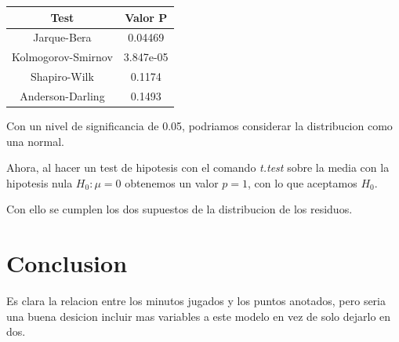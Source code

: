 \documentclass[onecolumn]{IEEEtran}
\begin{document}
    \begin{table}[h]
        \begin{center}
            \begin{tabular}{|c|c|}
                \hline Test & Valor P \\ \hline
                Jarque-Bera & 0.04469 \\ \hline
                Kolmogorov-Smirnov & 3.847e-05\\ \hline
                Shapiro-Wilk & 0.1174 \\ \hline
                Anderson-Darling & 0.1493 \\ \hline
            \end{tabular}
        \end{center}
    \end{table}

    Con un nivel de significancia de 0.05, podriamos considerar la distribucion como una normal.

    Ahora, al hacer un test de hipotesis con el comando \textit{t.test} sobre la media con la hipotesis nula $H_0: \mu = 0$ obtenemos un valor $p = 1$, con lo que aceptamos $H_0$.

    Con ello se cumplen los dos supuestos de la distribucion de los residuos.

    \section{Conclusion}
    Es clara la relacion entre los minutos jugados y los puntos anotados, pero seria una buena desicion incluir mas variables a este modelo en vez de solo dejarlo en dos.
\end{document}
